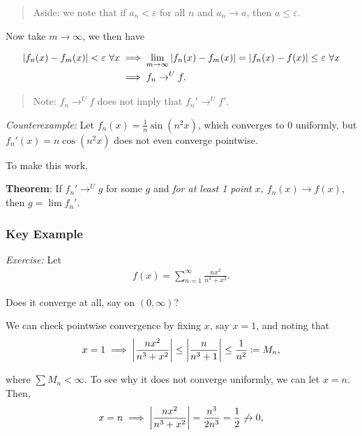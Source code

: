 \begin{quote}
Aside: we note that if \(a_n < \varepsilon\) for all \(n\) and
\(a_n \to a\), then \(a\leq \varepsilon\).
\end{quote}

Now take \(m\to \infty\), we then have

\begin{align*}
{\left\lvert {f_n(x) - f_m(x)} \right\rvert} < \varepsilon ~\forall x 
&\implies \lim_{m \to \infty} {\left\lvert {f_n(x) - f_m(x)} \right\rvert} = {\left\lvert {f_n(x) - f(x)} \right\rvert} \leq \varepsilon ~\forall x \\
&\implies f_n \to^U f
.\end{align*}

\begin{quote}
Note: \(f_n \to^U f\) does not imply that \(f_n' \to^U f'\).
\end{quote}

\emph{Counterexample:} Let \(f_n(x) = \frac 1 n \sin(n^2 x)\), which
converges to \(0\) uniformly, but \(f_n'(x) = n\cos(n^2 x)\) does not
even converge pointwise.

To make this work,

\textbf{Theorem}: If \(f_n' \to^U g\) for some \(g\) and \emph{for at
least 1 point} \(x, ~f_n(x) \to f(x)\), then \(g = \lim f_n'\).

\hypertarget{key-example}{%
\subsubsection{Key Example}\label{key-example}}

\emph{Exercise:} Let
\begin{align*}
f(x) = \sum_{n=1}^\infty \frac{nx^2}{n^3 + x^3}
.\end{align*}

Does it converge at all, say on \((0, \infty)\)?

We can check pointwise convergence by fixing \(x\), say \(x=1\), and
noting that
\begin{align*}
x = 1 \implies {\left\lvert {\frac{nx^2}{n^3 + x^2}} \right\rvert} \leq {\left\lvert {\frac n {n^3 + 1}} \right\rvert} \leq \frac 1 {n^2} \coloneqq M_n,
\end{align*}

where \(\sum M_n < \infty\). To see why it does not converge uniformly,
we can let \(x=n\). Then,
\begin{align*}
x=n \implies {\left\lvert {\frac{nx^2}{ n^3 + x^2 }} \right\rvert} = \frac{n^3}{2n^3} = \frac 1 2 \not\to 0,
\end{align*}

